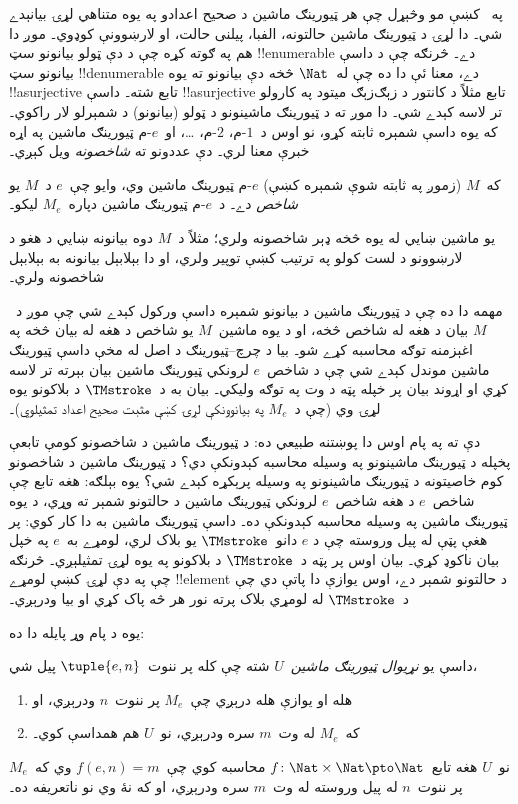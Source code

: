 \documentclass[../../../include/open-logic-section]{subfiles}
\begin{document}

په~ کښې مو وڅېړل چې هر ټيورينګ ماشين د صحيح اعدادو
په يوه متناهي لړۍ بيانېدے شي۔ دا لړۍ د ټيورينګ ماشين حالتونه، الفبا،
پيلنی حالت، او لارښوونې کوډوي۔ موږ دا هم په ګوته کړه چې د دې ټولو
بيانونو سټ !!{enumerable} دے۔ څرنګه چې د داسې بيانونو سټ
!!{denumerable} دے، معنا ئې دا ده چې له~$\Nat$ څخه دې بيانونو ته يوه
!!a{surjective} تابع شته۔ داسې !!a{surjective} تابع مثلاً د کانتور د
زېګ‌زېګ ميتود په کارولو تر لاسه کېدے شي۔ دا موږ ته د ټيورينګ
ماشينونو د ټولو (بيانونو) د شمېرلو لار راکوي۔ که يوه داسې شمېره
ثابته کړو، نو اوس د~$1$-م، $2$-م، \dots، او~$e$-م ټيورينګ ماشين په
اړه خبرې معنا لري۔ دې عددونو ته \emph{شاخصونه} ويل کېږي۔

\begin{defn}
که~$M$ (زموږ په ثابته شوې شمېره کښې) $e$-م ټيورينګ ماشين وي، وايو
چې~$e$ د~$M$ يو \emph{شاخص} دے۔ د~$e$-م ټيورينګ ماشين دپاره~$M_e$
ليکو۔
\end{defn}

يو ماشين ښايي له يوه څخه ډېر شاخصونه ولري؛ مثلاً د~$M$ دوه بيانونه
ښايي د هغو د لارښوونو د لست کولو په ترتيب کښې توپير ولري، او دا
بېلابېل بيانونه به بېلابېل شاخصونه ولري۔

مهمه دا ده چې د ټيورينګ ماشين د بيانونو شمېره داسې ورکول کېدے شي
چې موږ د~$M$ بيان د هغه له شاخص څخه، او د يوه ماشين~$M$ يو شاخص د
هغه له بيان څخه په اغېزمنه توګه محاسبه کړے شو۔ بيا د چرچ--ټيورينګ د
اصل له مخې داسې ټيورينګ ماشين موندل کېدے شي چې د شاخص~$e$ لرونکي
ټيورينګ ماشين بيان بېرته تر لاسه کړي او اړوند بيان پر خپله پټه د وت
په توګه وليکي۔ بيان به د~$\TMstroke$ د بلاکونو يوه لړۍ وي (چې د~$M_e$
په بيانوونکې لړۍ کښې مثبت صحيح اعداد تمثيلوي)۔

دې ته په پام اوس دا پوښتنه طبيعي ده: د ټيورينګ ماشين د شاخصونو کومې
تابعې پخپله د ټيورينګ ماشينونو په وسيله محاسبه کېدونکې دي؟ د ټيورينګ
ماشين د شاخصونو کوم خاصيتونه د ټيورينګ ماشينونو په وسيله پرېکړه کېدے
شي؟ يوه بېلګه: هغه تابع چې شاخص~$e$ د هغه شاخص~$e$ لرونکي ټيورينګ ماشين
د حالتونو شمېر ته وړي، د يوه ټيورينګ ماشين په وسيله محاسبه کېدونکې
ده۔ داسې ټيورينګ ماشين به دا کار کوي: پر هغې پټې له پيل وروسته چې د
$e$ دانو~$\TMstroke$ يو بلاک لري، لومړے به~$e$ په خپل بيان ناکوډ
کړي۔ بيان اوس پر پټه د~$\TMstroke$ د بلاکونو په يوه لړۍ تمثيلېږي۔
څرنګه چې په دې لړۍ کښې لومړے !!{element} د حالتونو شمېر دے، اوس
يوازې دا پاتې دي چې د~$\TMstroke$ له لومړي بلاک پرته نور هر څه پاک
کړي او بيا ودرېږي۔

يوه د پام وړ پايله دا ده:

\begin{thm} داسې يو \emph{نړيوال ټيورينګ
  ماشين}~$U$ شته چې کله پر ننوت~$\tuple{e,n}$ پيل شي،
  \begin{enumerate}
    \item هله او يوازې هله درېږي چې~$M_e$ پر ننوت~$n$ ودرېږي، او
    \item که~$M_e$ له وت~$m$ سره ودرېږي، نو~$U$ هم همداسې کوي۔
  \end{enumerate}
  نو~$U$ هغه تابع~$f\colon \Nat \times \Nat \pto \Nat$ محاسبه کوي
  چې~$f(e,n) = m$ وي که~$M_e$ پر ننوت~$n$ له پيل وروسته له وت~$m$
  سره ودرېږي، او که نۀ وي نو ناتعريفه ده۔
\end{thm}
\end{document}
